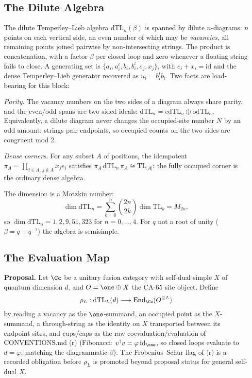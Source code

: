 \subsection{The Dilute Algebra}

The dilute Temperley--Lieb algebra \(\mathrm{dTL}_n(\beta)\) is spanned by
dilute \(n\)-diagrams: \(n\) points on each vertical side, an even number of
which may be \emph{vacancies}, all remaining points joined pairwise by
non-intersecting strings.  The product is concatenation, with a factor
\(\beta\) per closed loop and zero whenever a floating string fails to close.
A generating set is
\(\{a_i,a_i^t,b_i,b_i^t,e_j,x_j\}\), with \(e_i+x_i=\mathrm{id}\) and the
dense Temperley--Lieb generator recovered as \(u_i=b_i^tb_i\).  Two facts are
load-bearing for this block:

\emph{Parity.}  The vacancy numbers on the two sides of a diagram always share
parity, and the even/odd spans are two-sided ideals:
\(\mathrm{dTL}_n=\mathrm{edTL}_n\oplus\mathrm{odTL}_n\).  Equivalently, a
dilute diagram never changes the occupied-site number \(N\) by an odd amount:
strings pair endpoints, so occupied counts on the two sides are congruent
mod 2.

\emph{Dense corners.}  For any subset \(A\) of positions, the idempotent
\(\pi_A=\prod_{i\in A,\,j\notin A}x_je_i\) satisfies
\(\pi_A\,\mathrm{dTL}_n\,\pi_A\cong\mathrm{TL}_{|A|}\): the fully occupied
corner is the ordinary dense algebra.

The dimension is a Motzkin number:
\[
  \dim\mathrm{dTL}_n=\sum_{k=0}^n\binom{2n}{2k}\dim\mathrm{TL}_k=M_{2n},
\]
so \(\dim\mathrm{dTL}_n=1,2,9,51,323\) for \(n=0,\dots,4\).  For \(q\) not a
root of unity (\(\beta=q+q^{-1}\)) the algebra is semisimple.

\subsection{The Evaluation Map}

\textbf{Proposal.}  Let \(\Cc\) be a unitary fusion category with self-dual
simple \(X\) of quantum dimension \(d\), and \(O=\one\oplus X\) the CA-65 site
object.  Define
\[
  \rho_L:\mathrm{dTL}_L(d)\longrightarrow
  \operatorname{End}_{\Cc}(O^{\otimes L})
\]
by reading a vacancy as the \(\one\)-summand, an occupied point as the
\(X\)-summand, a through-string as the identity on \(X\) transported between
its endpoint sites, and cups/caps as the raw coevaluation/evaluation of
CONVENTIONS.md (r) (Fibonacci: \(v^\dagger v=\varphi\,\mathrm{id}_{\one}\), so
closed loops evaluate to \(d=\varphi\), matching the diagrammatic \(\beta\)).
The Frobenius--Schur flag of (r) is a recorded obligation before \(\rho_L\) is
promoted beyond proposal status for general self-dual \(X\).

